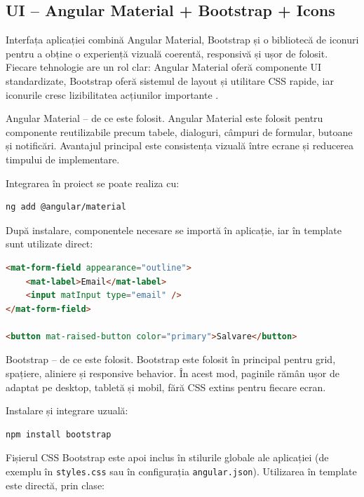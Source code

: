 \subsection{UI -- Angular Material + Bootstrap + Icons}
Interfața aplicației combină Angular Material, Bootstrap și o bibliotecă de iconuri pentru a obține o experiență vizuală coerentă, responsivă și ușor de folosit. Fiecare tehnologie are un rol clar: Angular Material oferă componente UI standardizate, Bootstrap oferă sistemul de layout și utilitare CSS rapide, iar iconurile cresc lizibilitatea acțiunilor importante \cite{angular_material_2026,bootstrap_docs_2026,bootstrap_icons_2026}.

Angular Material -- de ce este folosit. Angular Material este folosit pentru componente reutilizabile precum tabele, dialoguri, câmpuri de formular, butoane și notificări. Avantajul principal este consistența vizuală între ecrane și reducerea timpului de implementare.

Integrarea în proiect se poate realiza cu:

\begin{lstlisting}[language=bash]
ng add @angular/material
\end{lstlisting}

După instalare, componentele necesare se importă în aplicație, iar în template sunt utilizate direct:

\begin{lstlisting}[language=HTML]
<mat-form-field appearance="outline">
	<mat-label>Email</mat-label>
	<input matInput type="email" />
</mat-form-field>

<button mat-raised-button color="primary">Salvare</button>
\end{lstlisting}

Bootstrap -- de ce este folosit. Bootstrap este folosit în principal pentru grid, spațiere, aliniere și responsive behavior. În acest mod, paginile rămân ușor de adaptat pe desktop, tabletă și mobil, fără CSS extins pentru fiecare ecran.

Instalare și integrare uzuală:

\begin{lstlisting}[language=bash]
npm install bootstrap
\end{lstlisting}

Fișierul CSS Bootstrap este apoi inclus în stilurile globale ale aplicației (de exemplu în \texttt{styles.css} sau în configurația \texttt{angular.json}). Utilizarea în template este directă, prin clase:

